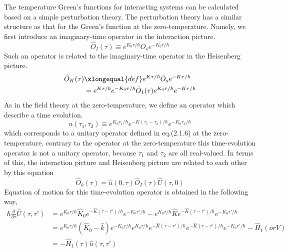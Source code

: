 The temperature Green's functions for interacting systems can be calculated based on a simple perturbation theory.
The perturbation theory has a similar structure as that for the Green's function at the zero-temperature.
Namely, we first introduce an imaginary-time operator in the interaction picture.
\begin{equation}
\hat{O}_{I}(\tau) \equiv e^{K_{0} \tau/\hbar}\hat{O}_{s}e^{-K_0\tau/\hbar}
\end{equation}
Such an operator is related to the imaginary-time operator in the Heisenberg picture.
\begin{equation}
\begin{aligned}
\hat{O}_{K}(\tau)& \xlongequal{def} e^{K\tau/\hbar}\hat{O}_{s}e^{-K\tau/\hbar}\\
&=e^{K\tau/\hbar}e^{-K_0\tau/\hbar}\hat{O}_{I}(\tau)e^{K_0\tau/\hbar}e^{-K\tau/\hbar}
\end{aligned}
\end{equation}
As in the field theory at the zero-temperature, we define an operator which describe a time evolution.
\begin{equation}
u(\tau_1,\tau_2)\equiv e^{K_0\tau_1/\hbar}e^{-K(\tau_1-\tau_2)/\hbar}e^{-K_0\tau_2/\hbar}
\end{equation}
which corresponds to a unitary operator defined in eq.(2.1.6) at the zero-temperature.
contrary to the operator at the zero-temperature this time-evolution operator is not a unitary operator, because $\tau_1$ and $\tau_2$ are all real-valued.
In terms of this, the interaction picture and Heisenberg picture are related to each other by this equation
\begin{equation}
\hat{O}_{k}(\tau)=\hat{u}(0,\tau)\hat{O}_{I}(\tau)\hat{U}(\tau,0)
\end{equation}
Equation of motion for this time-evolution operator is obtained in the following way,
\begin{equation}
\begin{aligned}
\hbar\frac{\partial}{\partial\tau}\hat{U}(\tau,\tau')&=e^{K_0\tau/\hbar} \hat{K}_0 e^{-\hat{K}(\tau-\tau')/\hbar} e^{-K_0\tau'/\hbar} -e^{K_0\tau/\hbar} \hat{K} e^{-\hat{K}(\tau-\tau')/\hbar} e^{-K_0\tau'/\hbar}\\
&=e^{K_0\tau/\hbar}(\hat{K}_0-\hat{k}) e^{-K_0\tau/\hbar} e^{K_0\tau/\hbar} e^{-\hat{K}(\tau-\tau')/\hbar} e^{-\hat{K}(\tau-\tau')/\hbar} e^{-K_0\tau'/\hbar}-\hat{H}_1(or V)\\
&=-\hat{H}_1(\tau)\hat{u}(\tau,\tau')
\end{aligned}
\end{equation}
